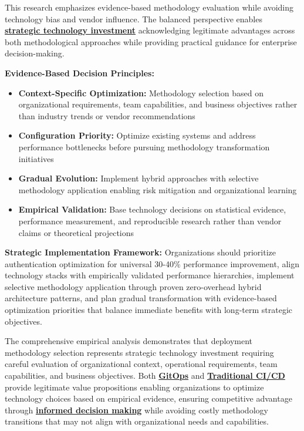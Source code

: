 This research emphasizes evidence-based methodology evaluation while avoiding technology bias and vendor influence. The balanced perspective enables \textbf{\hyperref[strategic_technology_planning]{strategic technology investment}} acknowledging legitimate advantages across both methodological approaches while providing practical guidance for enterprise decision-making.

\textbf{Evidence-Based Decision Principles:}
\begin{itemize}
\item \textbf{Context-Specific Optimization:} Methodology selection based on organizational requirements, team capabilities, and business objectives rather than industry trends or vendor recommendations
\item \textbf{Configuration Priority:} Optimize existing systems and address performance bottlenecks before pursuing methodology transformation initiatives
\item \textbf{Gradual Evolution:} Implement hybrid approaches with selective methodology application enabling risk mitigation and organizational learning
\item \textbf{Empirical Validation:} Base technology decisions on statistical evidence, performance measurement, and reproducible research rather than vendor claims or theoretical projections
\end{itemize}

\textbf{Strategic Implementation Framework:}
Organizations should prioritize authentication optimization for universal 30-40\% performance improvement, align technology stacks with empirically validated performance hierarchies, implement selective methodology application through proven zero-overhead hybrid architecture patterns, and plan gradual transformation with evidence-based optimization priorities that balance immediate benefits with long-term strategic objectives.

The comprehensive empirical analysis demonstrates that deployment methodology selection represents strategic technology investment requiring careful evaluation of organizational context, operational requirements, team capabilities, and business objectives. Both \textbf{\hyperref[beetz2021gitops]{GitOps}} and \textbf{\hyperref[fowler2013continuous]{Traditional CI/CD}} provide legitimate value propositions enabling organizations to optimize technology choices based on empirical evidence, ensuring competitive advantage through \textbf{\hyperref[kim2016devops]{informed decision making}} while avoiding costly methodology transitions that may not align with organizational needs and capabilities.